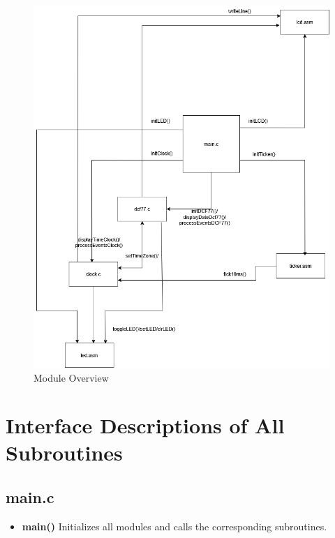 \documentclass[a4paper,12pt]{article}
\begin{document}
\begin{figure}[H]
    \centering
    \includegraphics[width=1\textwidth]{diagrams/1.ModuleOverview.png}
    \caption{Module Overview}
    \label{fig:ModuleOverview}
\end{figure}

\newpage


\section{Interface Descriptions of All Subroutines}


\subsection{main.c}
\begin{itemize}
    \item \textbf{main()}  
    Initializes all modules and calls the corresponding subroutines.
\end{itemize}
\end{document}
